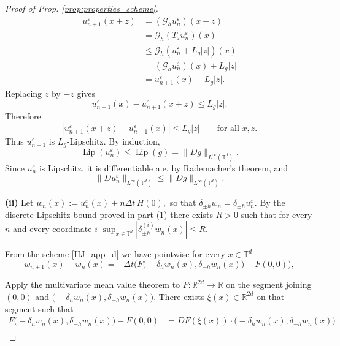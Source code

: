 \documentclass[10pt,a4paper]{amsart}
\newcommand{\R}{\mathbb{R}}
\newcommand{\T}{{\mathbb{T}}}
\begin{document}
\begin{proof}[Proof of Prop. \ref{prop:properties_scheme}]
\[
\begin{aligned}
u_{n+1}^\varepsilon(x+z)
&=(\mathcal G_h u_n^\varepsilon)(x+z) \\
&=\mathcal G_h(T_z u_n^\varepsilon)(x) \\
&\le \mathcal G_h(u_n^\varepsilon+L_g|z|)(x) \\
&=(\mathcal G_h u_n^\varepsilon)(x)+L_g|z| \\
&=u_{n+1}^\varepsilon(x)+L_g|z| .
\end{aligned}
\]
Replacing \(z\) by \(-z\) gives
\[
u_{n+1}^\varepsilon(x)-u_{n+1}^\varepsilon(x+z)\le L_g|z| .
\]
Therefore
\[
|u_{n+1}^\varepsilon(x+z)-u_{n+1}^\varepsilon(x)|
\le L_g|z|
\qquad\text{for all }x,z .
\]
Thus \(u_{n+1}^\varepsilon\) is \(L_g\)-Lipschitz. By induction,
\[
\operatorname{Lip}(u_n^\varepsilon)\le \operatorname{Lip}(g)
=\|Dg\|_{L^\infty(\T^d)} .
\]
Since \(u_n^\varepsilon\) is Lipschitz, it is differentiable a.e. by Rademacher's theorem, and
\[
\|D u_n^\varepsilon\|_{L^\infty(\T^d)}
\le \|Dg\|_{L^\infty(\T^d)} .
\]

		\noindent\textbf{(ii)}
Let
\(
w_n(x):=u_n^\varepsilon(x)+n\Delta t\,H(0),
\)
so that \(\delta_{\pm h}w_n=\delta_{\pm h}u_n^\varepsilon\). By the discrete Lipschitz bound proved in part (1) there exists \(R>0\) such that for every \(n\) and every coordinate \(i\)
\(
\sup_{x\in\T^d}|\delta^{(i)}_{\pm h} w_n(x)| \le R.
\)

From the scheme \eqref{HJ_app_d} we have pointwise for every \(x\in\T^d\)
\[
w_{n+1}(x)-w_n(x)
= -\Delta t\Big(F\big(-\delta_h w_n(x),\delta_{-h} w_n(x)\big)-F(0,0)\Big),
\]

Apply the multivariate mean value theorem to \(F:\R^{2d}\to\R\) on the segment joining \((0,0)\) and \(\big(-\delta_h w_n(x),\delta_{-h} w_n(x)\big)\). There exists \(\xi(x)\in\R^{2d}\) on that segment such that
\[
\begin{aligned}
F\big(-\delta_h w_n(x),\delta_{-h} w_n(x)\big)-F(0,0)
&= DF(\xi(x))\cdot\big(-\delta_h w_n(x),\delta_{-h} w_n(x)\big)\\
\end{aligned}
\]


\end{proof}
\end{document}
